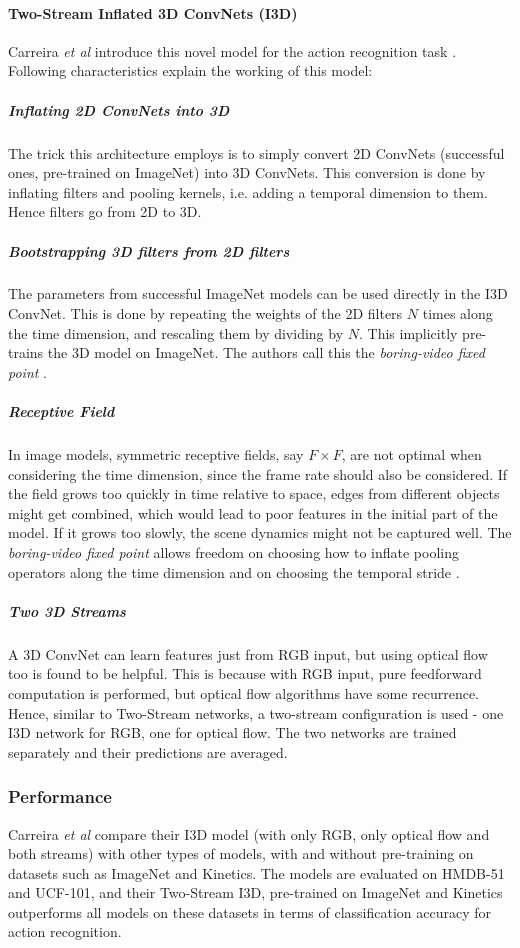 \paragraph{Two-Stream Inflated 3D ConvNets (I3D)}
Carreira \textit{et al} introduce this novel model for the action recognition task 
\cite{carreira2018quo}. Following characteristics explain the working of this model:

\subparagraph{Inflating 2D ConvNets into 3D} The trick this architecture employs is to 
simply convert 2D ConvNets (successful ones, pre-trained on ImageNet) into 3D ConvNets. This 
conversion is done by inflating filters and pooling kernels, i.e. adding a temporal 
dimension to them. Hence filters go from 2D to 3D.

\subparagraph{Bootstrapping 3D filters from 2D filters}
The parameters from successful ImageNet models can be used directly in the I3D ConvNet. This 
is done by repeating the weights of the 2D filters $N$ times along the time dimension, and 
rescaling them by dividing by $N$. This implicitly pre-trains the 3D model on ImageNet. The 
authors call this the \textit{boring-video fixed point} \cite{carreira2018quo}.

\subparagraph{Receptive Field}
In image models, symmetric receptive fields, say $F \times F$, are not optimal when 
considering the time dimension, since the frame rate should also be considered. If the field 
grows too quickly in time relative to space, edges from different objects might get 
combined, which would lead to poor features in the initial part of the model. If it grows 
too slowly, the scene dynamics might not be captured well. The \textit{boring-video fixed 
point} allows freedom on choosing how to inflate pooling operators along the time dimension 
and on choosing the temporal stride \cite{carreira2018quo}.

\subparagraph{Two 3D Streams}
A 3D ConvNet can learn features just from RGB input, but using optical flow too is found to 
be helpful. This is because with RGB input, pure feedforward computation is performed, but 
optical flow algorithms have some recurrence. Hence, similar to Two-Stream networks, a 
two-stream configuration is used - one I3D network for RGB, one for optical flow. The two 
networks are trained separately and their predictions are averaged.

\subsubsection{Performance}
Carreira \textit{et al} compare their I3D model (with only RGB, only optical flow and both 
streams) with other types of models, with and without pre-training on datasets such as 
ImageNet and Kinetics. The models are evaluated on HMDB-51 and UCF-101, and their 
Two-Stream I3D, pre-trained on ImageNet and Kinetics outperforms all models on these 
datasets in terms of classification accuracy for action recognition. 

